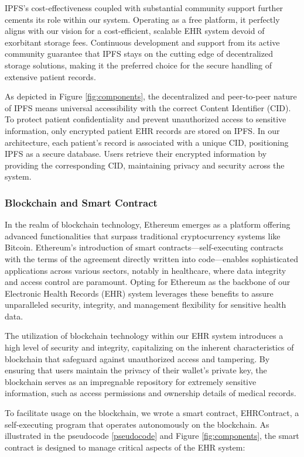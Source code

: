 \documentclass[12pt]{report}
\begin{document}
IPFS's cost-effectiveness coupled with substantial community support further cements its role within our system. Operating as a free platform, it perfectly aligns with our vision for a cost-efficient, scalable EHR system devoid of exorbitant storage fees. Continuous development and support from its active community guarantee that IPFS stays on the cutting edge of decentralized storage solutions, making it the preferred choice for the secure handling of extensive patient records.

As depicted in Figure \ref{fig:components}, the decentralized and peer-to-peer nature of IPFS means universal accessibility with the correct Content Identifier (CID). To protect patient confidentiality and prevent unauthorized access to sensitive information, only encrypted patient EHR records are stored on IPFS. In our architecture, each patient's record is associated with a unique CID, positioning IPFS as a secure database. Users retrieve their encrypted information by providing the corresponding CID, maintaining privacy and security across the system.


\subsubsection{Blockchain and Smart Contract}
In the realm of blockchain technology, Ethereum\cite{ethereum2014} emerges as a platform offering advanced functionalities that surpass traditional cryptocurrency systems like Bitcoin. Ethereum's introduction of smart contracts—self-executing contracts with the terms of the agreement directly written into code—enables sophisticated applications across various sectors, notably in healthcare, where data integrity and access control are paramount. Opting for Ethereum as the backbone of our Electronic Health Records (EHR) system leverages these benefits to assure unparalleled security, integrity, and management flexibility for sensitive health data.

The utilization of blockchain technology within our EHR system introduces a high level of security and integrity, capitalizing on the inherent characteristics of blockchain that safeguard against unauthorized access and tampering. By ensuring that users maintain the privacy of their wallet's private key, the blockchain serves as an impregnable repository for extremely sensitive information, such as access permissions and ownership details of medical records.

To facilitate usage on the blockchain, we wrote a  smart contract, EHRContract, a self-executing program that operates autonomously on the blockchain. As illustrated in the pseudocode \ref{pseudocode} and Figure \ref{fig:components}, the smart contract is designed to manage critical aspects of the EHR system:
\end{document}
